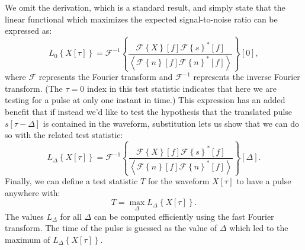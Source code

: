 We omit the derivation, which is a standard result, and simply state that the linear functional which maximizes the expected signal-to-noise ratio can be expressed as:~\cite{MatchedFilterPaper}
\begin{equation}
L_0\left\{X[\tau]\right\} = \mathcal{F}^{-1}\left\{ \frac{\mathcal{F}\left\{X\right\}[f] \mathcal{F}\left\{s\right\}^{*}[f]}{\left<\mathcal{F}\left\{n\right\}[f]\mathcal{F}\left\{n\right\}^{*}[f]\right>}\right\}[0],
\end{equation}
where $\mathcal{F}$ represents the Fourier transform and $\mathcal{F}^{-1}$ represents the inverse Fourier transform.  (The $\tau = 0$ index in this test statistic indicates that here we are testing for a pulse at only one instant in time.)  This expression has an added benefit that if instead we'd like to test the hypothesis that the translated pulse $s[\tau - \Delta]$ is contained in the waveform, substitution lets us show that we can do so with the related test statistic:
\begin{equation}
L_\Delta\left\{X[\tau]\right\} = \mathcal{F}^{-1}\left\{ \frac{\mathcal{F}\left\{X\right\}[f] \mathcal{F}\left\{s\right\}^{*}[f]}{\left<\mathcal{F}\left\{n\right\}[f]\mathcal{F}\left\{n\right\}^{*}[f]\right>}\right\}[\Delta].
\end{equation}
Finally, we can define a test statistic $T$ for the waveform $X[\tau]$ to have a pulse anywhere with:
\begin{equation}
T = \max_{\Delta} L_\Delta\left\{X[\tau]\right\}.
\end{equation}
The values $L_\Delta$ for all $\Delta$ can be computed efficiently using the fast Fourier transform.  The time of the pulse is guessed as the value of $\Delta$ which led to the maximum of $L_\Delta\left\{X[\tau]\right\}$.

